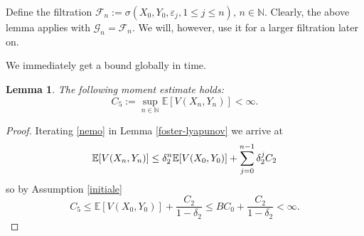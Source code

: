 \documentclass{article}
\newtheorem{lemma}[theorem]{Lemma}
\def\mE{\mathbb{E}}
\def\mP{\mathbb{P}}
\begin{document}
Define the filtration $\mathcal{F}_n:=\sigma(X_0,Y_0,\varepsilon_j,1\leq j\leq n)$,
$n\in\mathbb{N}$. Clearly, the above lemma applies with $\mathcal{G}_{n}=\mathcal{F}_{n}$. 
We will, however, use it for a larger filtration later on.


We immediately get a bound globally in time.
%
\begin{lemma}\label{moments} The following moment estimate holds:
$$
C_5:=\sup_{n\in\mathbb{N}}\mathbb{E}[V(X_n,Y_n)]<\infty.
$$
\end{lemma}
\begin{proof}
Iterating \eqref{nemo} in Lemma \ref{foster-lyapunov} we arrive at
  \vspace{-8pt}
\[
\mathbb{E}[V(X_n,Y_n)]\leq \delta_2^n\mathbb{E}[V(X_0,Y_0)]+\sum_{j=0}^{n-1}\delta_2^j C_2
\vspace{-8pt}
\]
  so by Assumption \ref{initiale}
  \[
C_5\leq \mathbb{E}[V(X_0,Y_0)]+\frac{C_2}{1-\delta_2}\leq BC_{0}
+\frac{C_2}{1-\delta_2}<\infty.\]
\end{proof}



% 
%
%
%
%
\end{document}
